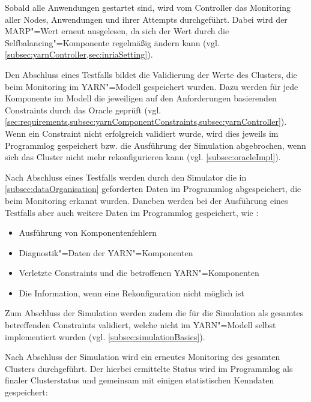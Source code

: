 Sobald alle Anwendungen gestartet sind, wird vom Controller das Monitoring aller Nodes, Anwendungen und ihrer Attempts durchgeführt.
Dabei wird der \gls{MARP}"=Wert erneut ausgelesen, da sich der Wert durch die Selfbalancing"=Komponente regelmäßig ändern kann (vgl. \cref{subsec:yarnController,sec:inriaSetting}).

Den Abschluss eines Testfalls bildet die Validierung der Werte des Clusters, die beim Monitoring im YARN"=Modell gespeichert wurden.
Dazu werden für jede Komponente im Modell die jeweiligen auf den Anforderungen basierenden Constraints durch das Oracle geprüft (vgl. \cref{sec:requirements,subsec:yarnComponentConstraints,subsec:yarnController}).
Wenn ein Constraint nicht erfolgreich validiert wurde, wird dies jeweils im Programmlog gespeichert bzw. die Ausführung der Simulation abgebrochen, wenn sich das Cluster nicht mehr rekonfigurieren kann (vgl. \cref{subsec:oracleImpl}).

Nach Abschluss eines Testfalls werden durch den Simulator die in \cref{subsec:dataOrganisation} geforderten Daten im Programmlog abgespeichert, die beim Monitoring erkannt wurden.
Daneben werden bei der Ausführung eines Testfalls aber auch weitere Daten im Programmlog gespeichert, wie \zB:

\begin{itemize}
    \item Ausführung von Komponentenfehlern
    \item Diagnostik"=Daten der YARN"=Komponenten
    \item Verletzte Constraints und die betroffenen YARN"=Komponenten
    \item Die Information, wenn eine Rekonfiguration nicht möglich ist
\end{itemize}

Zum Abschluss der Simulation werden zudem die für die Simulation als gesamtes betreffenden Constraints validiert, welche nicht im YARN"=Modell selbst implementiert wurden (vgl. \cref{subsec:simulationBasics}).

Nach Abschluss der Simulation wird ein erneutes Monitoring des gesamten Clusters durchgeführt.
Der hierbei ermittelte Status wird im Programmlog als finaler Clusterstatus und gemeinsam mit einigen statistischen Kenndaten gespeichert:

